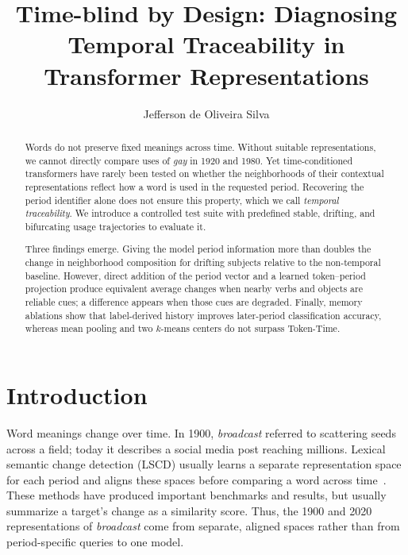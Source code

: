 \documentclass[runningheads]{llncs}
\begin{document}
\title{Time-blind by Design: Diagnosing Temporal Traceability in Transformer Representations}

\author{Jefferson de Oliveira Silva}


\maketitle

\begin{abstract}
Words do not preserve fixed meanings across time. Without suitable
representations, we cannot directly compare uses of \emph{gay} in 1920 and
1980. Yet time-conditioned transformers have rarely been
tested on whether the neighborhoods of their contextual representations reflect
how a word is used in the requested period. Recovering the period identifier
alone does not ensure this property, which we call \emph{temporal
traceability}. We introduce a controlled test suite with predefined stable,
drifting, and bifurcating usage trajectories to evaluate it.

Three findings emerge. Giving the model period information more than doubles
the change in neighborhood composition for drifting subjects relative to the
non-temporal baseline. However, direct addition of the period vector and a
learned token--period projection produce equivalent average changes when nearby
verbs and objects are reliable cues; a difference appears when those cues are
degraded. Finally, memory ablations show that label-derived history improves
later-period classification accuracy, whereas mean pooling and two
\(k\)-means centers do not surpass Token-Time.

\end{abstract}

\section{Introduction}

Word meanings change over time. In 1900, \emph{broadcast}
referred to scattering seeds across a field; today it describes a social media
post reaching millions. Lexical semantic change detection (LSCD) usually learns
a separate representation space for each period and aligns these spaces before
comparing a word across time~\cite{schlechtweg2020semeval,tahmasebi2021survey}.
These methods have produced important benchmarks and results, but usually
summarize a target's change as a similarity score. Thus,
the 1900 and 2020 representations of \emph{broadcast} come from separate,
aligned spaces rather than from period-specific queries to one model.
\end{document}
